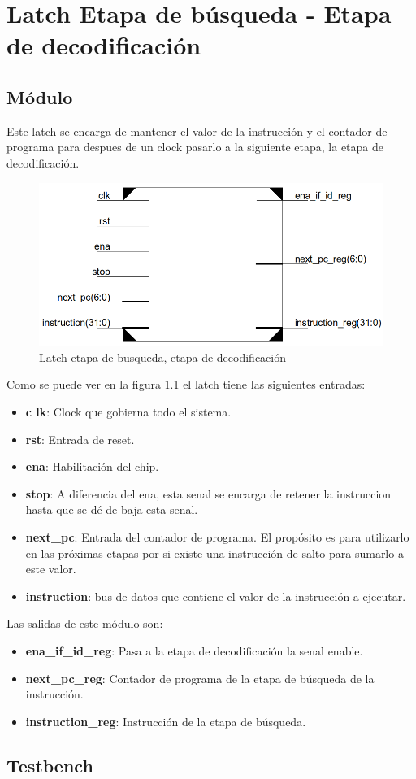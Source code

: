 \chapter{Latch Etapa de búsqueda - Etapa de decodificaci\'on}
\section{M\'odulo}
Este latch se encarga de mantener el valor de la instrucci\'on y el contador de programa para despues de un clock pasarlo a la siguiente etapa, la etapa de decodificaci\'on.

\begin{figure}[H]
\centering
\includegraphics[scale=0.35]{img/latch_if_id}
\caption{Latch etapa de busqueda, etapa de decodificaci\'on}
\label{fig:latchifid}
\end{figure}

Como se puede ver en la figura \ref{fig:latchifid} el latch tiene las siguientes entradas:
\begin{itemize}
  \item \textbf{c
  lk}: Clock que gobierna todo el sistema.
  \item \textbf{rst}: Entrada de reset.
  \item \textbf{ena}: Habilitaci\'on del chip.
  \item \textbf{stop}: A diferencia del ena, esta senal se encarga de retener la instruccion hasta que se d\'e de baja esta senal.
  \item \textbf{next\_pc}: Entrada del contador de programa. El prop\'osito es para utilizarlo en las pr\'oximas etapas por si existe una instrucci\'on de salto para sumarlo a este valor.
  \item \textbf{instruction}: bus de datos que contiene el valor de la instrucci\'on a ejecutar.  
\end{itemize}

Las salidas de este m\'odulo son:
\begin{itemize}
  \item \textbf{ena\_if\_id\_reg}: Pasa a la etapa de decodificaci\'on la senal enable.
  \item \textbf{next\_pc\_reg}: Contador de programa de la etapa de b\'usqueda de la instrucci\'on.
  \item \textbf{instruction\_reg}: Instrucci\'on de la etapa de b\'usqueda.
\end{itemize}

\section{Testbench}